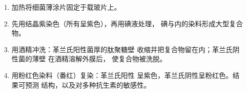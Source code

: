 \begin{method}[革兰氏染色]\label{met:b1:cell-unit-of-life:gram}
\begin{enumerate}
  \item 加热将细菌薄涂片固定于载玻片上。
  \item 先用结晶紫染色（所有呈紫色），再用碘液处理，
        碘与内的染料形成大型复合物。
  \item 用酒精冲洗：革兰氏阳性菌厚的肽聚糖壁
        收缩并把复合物留在内；革兰氏阴性菌的薄壁
        在酒精溶解外膜后，
        使复合物被洗脱。
  \item 用粉红色染料（番红）复染：革兰氏阳性
        呈紫色，革兰氏阴性呈粉红色。结果可预测
        结构，以及对多种抗生素的敏感性。
\end{enumerate}
\end{method}


